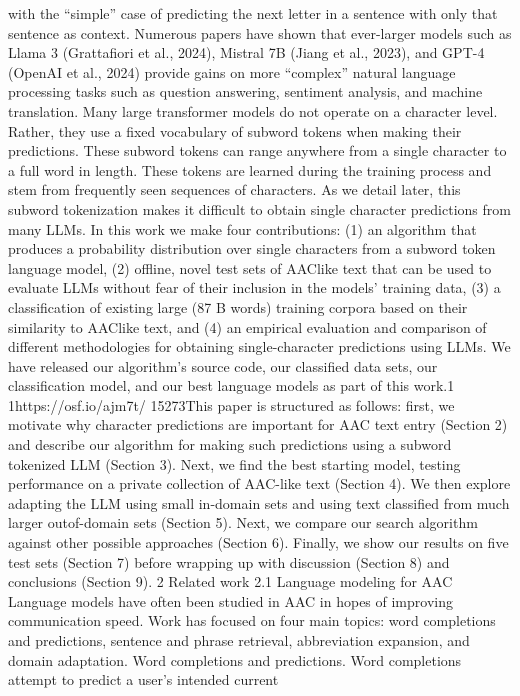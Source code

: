 with the “simple” case of predicting the next letter
in a sentence with only that sentence as context. Numerous papers have shown that ever-larger models
such as Llama 3 (Grattafiori et al., 2024), Mistral
7B (Jiang et al., 2023), and GPT-4 (OpenAI et al.,
2024) provide gains on more “complex” natural
language processing tasks such as question answering, sentiment analysis, and machine translation.
Many large transformer models do not operate
on a character level. Rather, they use a fixed vocabulary of subword tokens when making their predictions. These subword tokens can range anywhere
from a single character to a full word in length.
These tokens are learned during the training process and stem from frequently seen sequences of
characters. As we detail later, this subword tokenization makes it difficult to obtain single character predictions from many LLMs.
In this work we make four contributions: (1)
an algorithm that produces a probability distribution over single characters from a subword token
language model, (2) offline, novel test sets of AAClike text that can be used to evaluate LLMs without
fear of their inclusion in the models’ training data,
(3) a classification of existing large (87 B words)
training corpora based on their similarity to AAClike text, and (4) an empirical evaluation and comparison of different methodologies for obtaining
single-character predictions using LLMs.
We have released our algorithm’s source code,
our classified data sets, our classification model,
and our best language models as part of this work.1
1https://osf.io/ajm7t/
15273This paper is structured as follows: first, we motivate why character predictions are important for
AAC text entry (Section 2) and describe our algorithm for making such predictions using a subword
tokenized LLM (Section 3). Next, we find the best
starting model, testing performance on a private
collection of AAC-like text (Section 4). We then
explore adapting the LLM using small in-domain
sets and using text classified from much larger outof-domain sets (Section 5). Next, we compare our
search algorithm against other possible approaches
(Section 6). Finally, we show our results on five test
sets (Section 7) before wrapping up with discussion
(Section 8) and conclusions (Section 9).
2 Related work
2.1 Language modeling for AAC
Language models have often been studied in AAC
in hopes of improving communication speed. Work
has focused on four main topics: word completions
and predictions, sentence and phrase retrieval, abbreviation expansion, and domain adaptation.
Word completions and predictions. Word completions attempt to predict a user’s intended current

